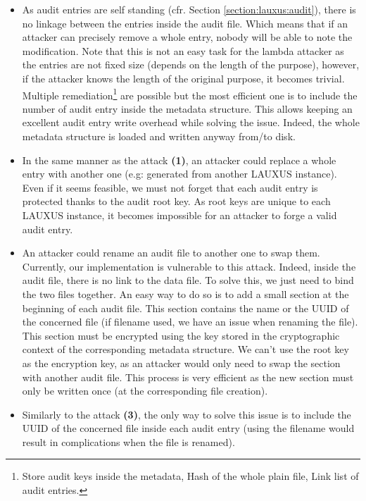 \documentclass[../main.tex]{subfiles}
\begin{document}
\begin{itemize}
    \item[\textbf{(1)}] As audit entries are self standing (cfr. Section \ref{section:lauxus:audit}), there is no linkage between the entries inside the audit file. Which means that if an attacker can precisely remove a whole entry, nobody will be able to note the modification. Note that this is not an easy task for the lambda attacker as the entries are not fixed size (depends on the length of the purpose), however, if the attacker knows the length of the original purpose, it becomes trivial. Multiple remediation\footnote{Store audit keys inside the metadata, Hash of the whole plain file, Link list of audit entries.} are possible but the most efficient one is to include the number of audit entry inside the metadata structure. This allows keeping an excellent audit entry write overhead while solving the issue. Indeed, the whole metadata structure is loaded and written anyway from/to disk.
    \item[\textbf{(2)}] In the same manner as the attack \textbf{(1)}, an attacker could replace a whole entry with another one (e.g: generated from another LAUXUS instance). Even if it seems feasible, we must not forget that each audit entry is protected thanks to the audit root key. As root keys are unique to each LAUXUS instance, it becomes impossible for an attacker to forge a valid audit entry.
    \item[\textbf{(3)}] An attacker could rename an audit file to another one to swap them. Currently, our implementation is vulnerable to this attack. Indeed, inside the audit file, there is no link to the data file. To solve this, we just need to bind the two files together. An easy way to do so is to add a small section at the beginning of each audit file. This section contains the name or the UUID of the concerned file (if filename used, we have an issue when renaming the file). This section must be encrypted using the key stored in the cryptographic context of the corresponding metadata structure. We can't use the root key as the encryption key, as an attacker would only need to swap the section with another audit file. This process is very efficient as the new section must only be written once (at the corresponding file creation).
    \item[\textbf{(4)}] Similarly to the attack \textbf{(3)}, the only way to solve this issue is to include the UUID of the concerned file inside each audit entry (using the filename would result in complications when the file is renamed).

\end{itemize}
\end{document}
